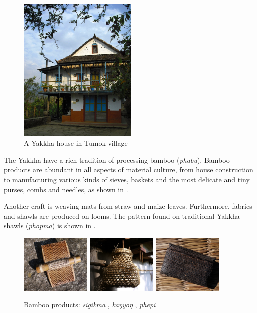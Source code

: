 \begin{figure}[t]
\centering
\includegraphics[height=7cm]{figures/house.jpg}
\caption{A Yakkha house in Tumok village}\label{house}
\end{figure}


The Yakkha have a rich tradition of processing bamboo (\emph{phabu}). Bamboo products are abundant in all aspects  of material culture, from house construction to manufacturing various kinds of sieves, baskets and the most delicate and tiny purses, combs and needles, as shown in .

Another craft is weaving mats from straw and maize leaves. Furthermore, fabrics and shawls are produced on looms.  The pattern found on traditional Yakkha shawls (\emph{phopma}) is shown in . 


 \begin{figure}[t]
 \includegraphics[width=0.30\textwidth]{figures/comb.jpg}
 \hfill
 \includegraphics[width=0.30\textwidth]{figures/kangyong.jpg}
 \hfill
 \includegraphics[width=0.30\textwidth]{figures/phepi.jpg}
 \caption{Bamboo  products: \emph{sigikma} , \emph{kaŋyoŋ} , \emph{phepi} }\label{phabu}
 \end{figure}



